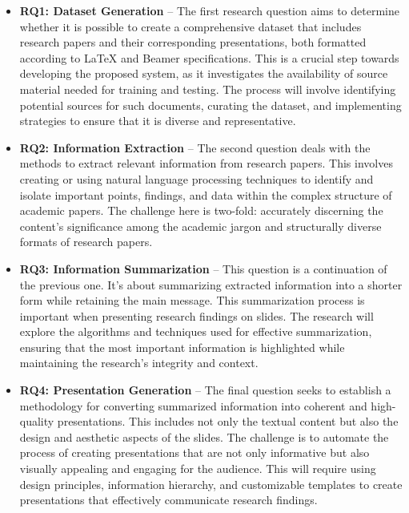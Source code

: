 \begin{itemize}
  \item \textbf{RQ1: Dataset Generation} – The first research question aims to determine whether it is possible to create a comprehensive dataset that includes research papers and their corresponding presentations, both formatted according to \LaTeX{} and Beamer specifications. This is a crucial step towards developing the proposed system, as it investigates the availability of source material needed for training and testing. The process will involve identifying potential sources for such documents, curating the dataset, and implementing strategies to ensure that it is diverse and representative.
  
  \item \textbf{RQ2: Information Extraction} – The second question deals with the methods to extract relevant information from research papers. This involves creating or using natural language processing techniques to identify and isolate important points, findings, and data within the complex structure of academic papers. The challenge here is two-fold: accurately discerning the content's significance among the academic jargon and structurally diverse formats of research papers.
  
  \item \textbf{RQ3: Information Summarization} – This question is a continuation of the previous one. It's about summarizing extracted information into a shorter form while retaining the main message. This summarization process is important when presenting research findings on slides. The research will explore the algorithms and techniques used for effective summarization, ensuring that the most important information is highlighted while maintaining the research's integrity and context.
  
  \item \textbf{RQ4: Presentation Generation} – The final question seeks to establish a methodology for converting summarized information into coherent and high-quality presentations. This includes not only the textual content but also the design and aesthetic aspects of the slides. The challenge is to automate the process of creating presentations that are not only informative but also visually appealing and engaging for the audience. This will require using design principles, information hierarchy, and customizable templates to create presentations that effectively communicate research findings.
\end{itemize}

